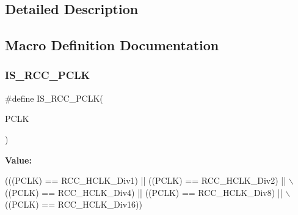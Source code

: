 \subsection{Detailed Description}


\subsection{Macro Definition Documentation}
\mbox{\label{group___r_c_c___a_p_b1___a_p_b2___clock___source_gab70f1257ea47c1da4def8e351af4d9f2}} 
\subsubsection{\texorpdfstring{I\+S\+\_\+\+R\+C\+C\+\_\+\+P\+C\+LK}{IS\_RCC\_PCLK}}
{\footnotesize\ttfamily \#define I\+S\+\_\+\+R\+C\+C\+\_\+\+P\+C\+LK(\begin{DoxyParamCaption}\item[{}]{P\+C\+LK }\end{DoxyParamCaption})}

{\bfseries Value\+:}
\begin{DoxyCode}
(((PCLK) == RCC\_HCLK\_Div1) || ((PCLK) == RCC\_HCLK\_Div2) || \(\backslash\)
                           ((PCLK) == RCC\_HCLK\_Div4) || ((PCLK) == RCC\_HCLK\_Div8) || \(\backslash\)
                           ((PCLK) == RCC\_HCLK\_Div16))
\end{DoxyCode}
